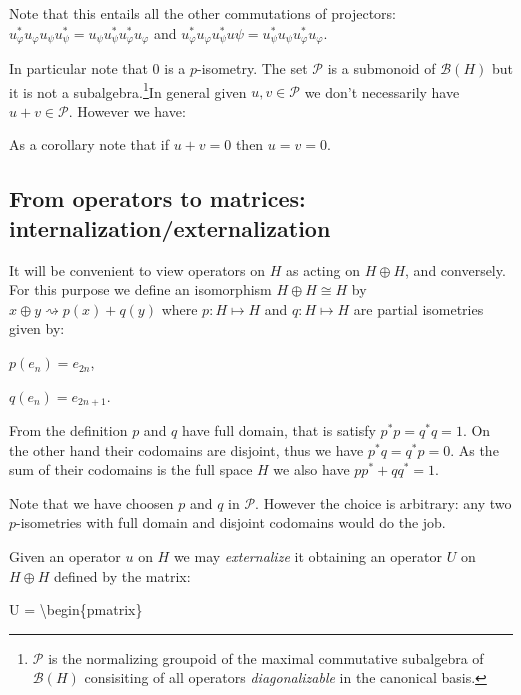 Note that this entails all the other commutations of projectors:
\(u^*_\varphi u_\varphi u_\psi u^*_\psi = u_\psi u^*_\psi u^*_\varphi u_\varphi\)
and
\(u^*_\varphi u_\varphi u^*_\psi u\psi = u^*_\psi u_\psi u^*_\varphi u_\varphi\).

In particular note that \(0\) is a \(p\)-isometry. The set
\(\mathcal{P}\) is a submonoid of \(\mathcal{B}(H)\) but it is not a
subalgebra.\footnote{\(\mathcal{P}\) is the normalizing groupoid of the
  maximal commutative subalgebra of \(\mathcal{B}(H)\) consisiting of
  all operators \emph{diagonalizable} in the canonical basis.}In general
given \(u,v\in\mathcal{P}\) we don't necessarily have
\(u+v\in\mathcal{P}\). However we have:

As a corollary note that if \(u+v=0\) then \(u=v=0\).


\subsection{From operators to matrices: internalization/externalization}\label{from-operators-to-matrices-internalizationexternalization}

It will be convenient to view operators on \(H\) as acting on
\(H\oplus H\), and conversely. For this purpose we define an isomorphism
\(H\oplus H \cong H\) by \(x\oplus y\rightsquigarrow p(x)+q(y)\) where
\(p:H\mapsto H\) and \(q:H\mapsto H\) are partial isometries given by:

\begin{description}
\tightlist
\item[]
\(p(e_n) = e_{2n}\),

\(q(e_n) = e_{2n+1}\).
\end{description}

From the definition \(p\) and \(q\) have full domain, that is satisfy
\(p^* p = q^* q = 1\). On the other hand their codomains are disjoint,
thus we have \(p^*q = q^*p = 0\). As the sum of their codomains is the
full space \(H\) we also have \(pp^* + qq^* = 1\).

Note that we have choosen \(p\) and \(q\) in \(\mathcal{P}\). However
the choice is arbitrary: any two \(p\)-isometries with full domain and
disjoint codomains would do the job.

Given an operator \(u\) on \(H\) we may \emph{externalize} it obtaining
an operator \(U\) on \(H\oplus H\) defined by the matrix:

\begin{description}
\tightlist
\item[]
U = \textbackslash{}begin\{pmatrix\}
\end{description}

